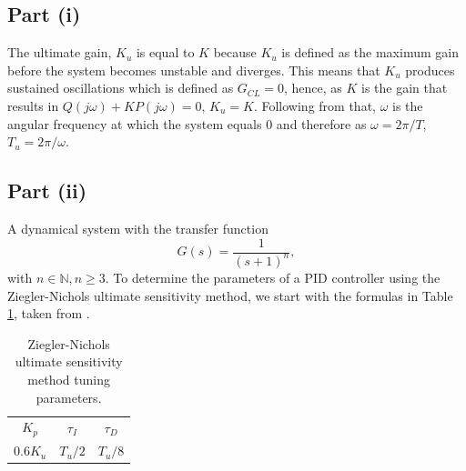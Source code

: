 \documentclass[10pt,a4paper]{article}
\begin{document}
    \subsection{Part (i)}
        The ultimate gain, $K_u$ is equal to $K$ because $K_u$ is defined as the maximum gain before the system becomes unstable and diverges. This means that $K_u$ produces sustained oscillations which is defined as $G_{CL} = 0$, hence, as $K$ is the gain that results in $Q(j \omega) + KP(j \omega) = 0$, $K_u = K$. Following from that, $\omega$ is the angular frequency at which the system equals $0$ and therefore as $\omega = 2 \pi / T$, $T_u = 2 \pi / \omega$.
    \subsection{Part (ii)}
        A dynamical system with the transfer function
        \begin{equation}
            G(s) = \frac{1}{(s + 1)^n},
        \end{equation}
        with $n \in \mathbb{N}, n \ge 3$. To determine the parameters of a PID controller using the Ziegler-Nichols ultimate sensitivity method, we start with the formulas in Table \ref{tb:znu_formulas}, taken from \cite[][Table 10.3]{sopaskis_2023_control}.
        \begin{table}[h]
            \centering
            \begin{tabular}{ c | c | c }
                $K_p$    & $\tau_I$ & $\tau_D$ \\
                $0.6K_u$ & $T_u/2$  & $T_u/8$
            \end{tabular}
            \caption{Ziegler-Nichols ultimate sensitivity method tuning parameters.}
            \label{tb:znu_formulas}
        \end{table}
        

    \printbibliography
\end{document}
